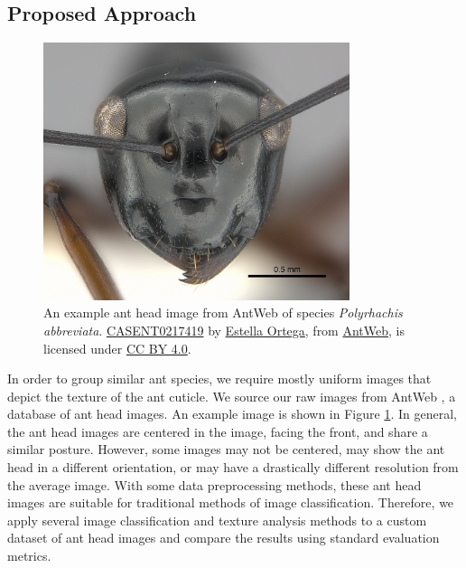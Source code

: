 \documentclass[12pt]{article}
\begin{document}
\subsection{Proposed Approach}

\begin{figure}
    \centering
    \includegraphics[width=0.8\textwidth]{assets/images/CASENT0217419.jpg}
    \caption{ An example ant head image from AntWeb of species
        \textit{Polyrhachis abbreviata}.
        \href{https://www.antweb.org/bigPicture.do?name=casent0217419&shot=h&number=1}{CASENT0217419}
        by \href{https://www.antweb.org/artist.do?id=92}{Estella Ortega}, from
        \href{https://www.antweb.org}{AntWeb}, is licensed under
        \href{https://creativecommons.org/licenses/by/4.0/}{CC BY 4.0}.}
    \label{fig:CASENT0217419}
\end{figure}

In order to group similar ant species, we require mostly uniform images that
depict the texture of the ant cuticle. We source our raw images from AntWeb
\cite{perrichot_antweb_2012}, a database of ant head images. An example image is
shown in Figure \ref{fig:CASENT0217419}. In general, the ant head images are
centered in the image, facing the front, and share a similar posture. However,
some images may not be centered, may show the ant head in a different
orientation, or may have a drastically different resolution from the average
image. With some data preprocessing methods, these ant head images are suitable
for traditional methods of image classification. Therefore, we apply several
image classification and texture analysis methods to a custom dataset of ant
head images and compare the results using standard evaluation metrics.
\end{document}
